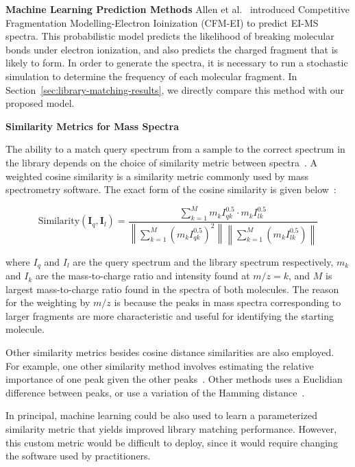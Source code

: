 \documentclass{article}
\begin{document}
\textbf{Machine Learning Prediction Methods} Allen et al.~\cite{allen2016computational} introduced Competitive Fragmentation Modelling-Electron Ioinization (CFM-EI) to predict EI-MS spectra. This probabilistic model predicts the likelihood of breaking molecular bonds under electron ionization, and also predicts the charged fragment that is likely to form. In order to generate the spectra, it is necessary to run a stochastic simulation to determine the frequency of each molecular fragment.
In Section~\ref{sec:library-matching-results}, we directly compare this method with our proposed model.

\textbf{Similarity Metrics for Mass Spectra}

The ability to a match query spectrum from a sample to the correct spectrum in the library depends on the choice of similarity metric between spectra~\cite{mclafferty1974probability,stein1994optimization}.
A weighted cosine similarity is a similarity metric commonly used by mass spectrometry software. The exact form of the cosine similarity is given below~\cite{stein1994optimization}:

\begin{equation}\label{eq:stein-similarity}
\text{Similarity}(\boldsymbol{I}_q, \boldsymbol{I}_l) = \frac{\sum_{k=1}^{M} m_{k} I_{qk}^{0.5} \cdot m_{k} I_{lk}^{0.5}}{\left\lVert\sum_{k=1}^{M} (m_{k} I_{qk}^{0.5})^2\right\rVert \left\lVert\sum_{k=1}^{M} (m_{k} I_{lk}^{0.5})\right\rVert}
\end{equation}

where \textbf{$I_q$} and \textbf{$I_l$} are the query spectrum and the library spectrum respectively, $m_k$ and $I_k$ are the mass-to-charge ratio and intensity found at $m/z = k$, and $M$ is largest mass-to-charge ratio found in the spectra of both molecules. The reason for the weighting by $m/z$ is because the peaks in mass spectra corresponding to larger fragments are more characteristic and useful for identifying the starting molecule.

Other similarity metrics besides cosine distance similarities are also employed. For example, one other similarity method involves estimating the relative importance of one peak given the other peaks~\cite{mclafferty1974probability}. Other methods uses a Euclidian difference between peaks, or use a variation of the Hamming distance~\cite{stein1994optimization,hertz1971identification}.

In principal, machine learning could be also used to learn a parameterized similarity metric that yields improved library matching performance. However, this custom metric would be difficult to deploy, since it would require changing the software used by practitioners. 
\end{document}
